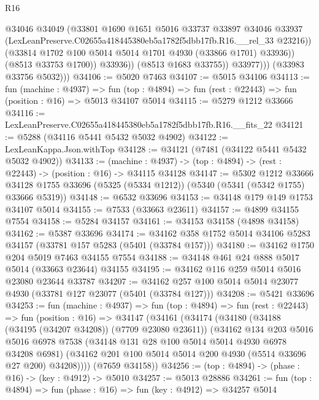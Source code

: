 \begin{lexlean}{R16}
\begin{coremodule}
                        @34046
                        @34049
                        (@33801
                          @1690
                          @1651
                          @5016
                          @33737
                          @33897
                          @34046
                          @33937
                          (LexLeanPreserve.C02655a418445380eb5a1782f5dbb17fb.R16.__rel_33 @23216))
                        (@33814 @1702 @100 @5014 @5014 @1701 @4930 (@33866 @1701) @33936))
                      (@8513 @33753 @1700))
                    @33936))
                (@8513 @1683 @33755))
              @33977)))
        (@33983 @33756 @5032)))
@34106 := @5020 @7463
@34107 := @5015 @34106
@34113 := fun (machine : @4937) =>
  fun (top : @4894) => fun (rest : @22443) => fun (position : @16) => @5013 @34107 @5014
@34115 := @5279 @1212 @33666
@34116 := LexLeanPreserve.C02655a418445380eb5a1782f5dbb17fb.R16.__fits_22
@34121 := @5288 (@34116 @5441 @5432 @5032 @4902)
@34122 := LexLeanKappa.Json.withTop
@34128 := @34121 (@7481 (@34122 @5441 @5432 @5032 @4902))
@34133 := (machine : @4937) -> (top : @4894) -> (rest : @22443) -> (position : @16) -> @34115 @34128
@34147 := @5302
    @1212
    @33666
    @34128
    @1755
    @33696
    (@5325 (@5334 @1212))
    (@5340 (@5341 (@5342 @1755) @33666 @5319))
@34148 := @6532 @33696
@34153 := @34148 @179 @149 @1753 @34107 @5014
@34155 := @7533 (@33663 @23611)
@34157 := @4899 @34155 @7554
@34158 := @5284 @34157
@34161 := @34153 @34158 (@4898 @34158)
@34162 := @5387 @33696
@34174 := @34162 @358 @1752 @5014 @34106 @5283 @34157 (@33781 @157 @5283 (@5401 (@33784 @157)))
@34180 := @34162 @1750 @204 @5019 @7463 @34155 @7554
@34188 := @34148 @461 @24 @888 @5017 @5014 (@33663 @23644) @34155
@34195 := @34162 @116 @259 @5014 @5016 @23080 @23644 @33787
@34207 := @34162 @257 @100 @5014 @5014 @23077 @4930 (@33781 @127 @23077 (@5401 (@33784 @127)))
@34208 := @5421 @33696
@34253 := fun (machine : @4937) =>
  fun (top : @4894) =>
  fun (rest : @22443) =>
  fun (position : @16) =>
  @34147
    (@34161
      (@34174
        (@34180
          (@34188 (@34195 (@34207 @34208)) (@7709 @23080 @23611))
          (@34162
            @134
            @203
            @5016
            @5016
            @6978
            @7538
            (@34148 @131 @28 @100 @5014 @5014 @4930 @6978 @34208 @6981)
            (@34162 @201 @100 @5014 @5014 @200 @4930 (@5514 @33696 @27 @200) @34208))))
      (@7659 @34158))
@34256 := (top : @4894) -> (phase : @16) -> (key : @4912) -> @5010
@34257 := @5013 @28886
@34261 := fun (top : @4894) => fun (phase : @16) => fun (key : @4912) => @34257 @5014

\end{coremodule}
\end{lexlean}
